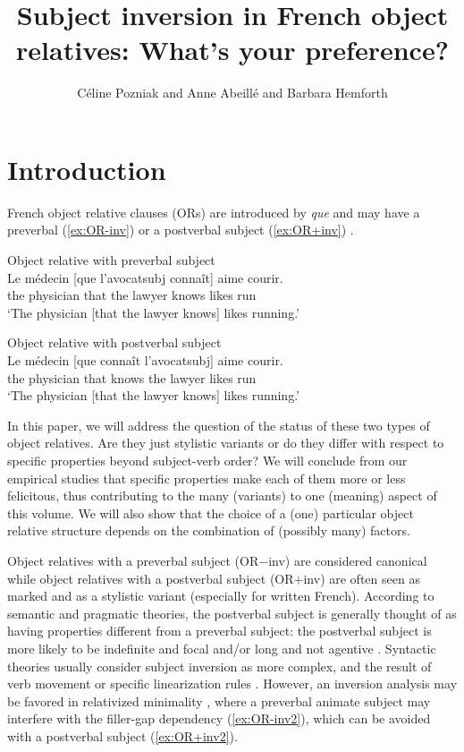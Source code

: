 \documentclass[output=paper]{langscibook}
\author{Céline Pozniak\affiliation{Université Paris 8, Structures Formelles du Langage, CNRS} and 
        Anne Abeillé\affiliation{Université de Paris, Laboratoire de linguistique formelle} and  
        Barbara Hemforth\affiliation{Université de Paris, Laboratoire de linguistique formelle, CNRS}}
\title{Subject inversion in French object relatives: What’s your preference?}
\begin{document}
\maketitle


\section{Introduction} 
French object relative clauses (ORs) are introduced by \textit{que} and may have a preverbal (\ref{ex:OR-inv}) or a postverbal subject (\ref{ex:OR+inv})  \citep{LeBidoisR1950, kayne1978}.


\begin{exe}
\ex Object relative with preverbal subject\label{ex:OR-inv}\\ 
\gll Le médecin [que l'avocat{\tiny subj} connaît] aime courir.\\   
the physician that {the lawyer} knows likes run\\
\glt `The physician [that the lawyer knows] likes running.'

\ex Object relative with postverbal subject\label{ex:OR+inv}\\  
\gll Le médecin [que connaît l'avocat{\tiny subj}] aime courir.\\    
the physician that knows {the lawyer}  likes run\\
\glt `The physician [that the lawyer knows] likes running.'
\end{exe}


In this paper, we will address the question of the status of these two
types of object relatives. Are they just stylistic variants or do they
differ with respect to specific properties beyond subject-verb order?
We will conclude from our empirical studies that specific properties
make each of them more or less felicitous, thus contributing to the
many (variants) to one (meaning) aspect of this volume. We will also
show that the choice of a (one) particular object relative structure
depends on the combination of (possibly many) factors.

\begin{sloppypar}
  Object relatives with a preverbal subject (OR$-$inv) are considered
  canonical while object relatives with a postverbal subject
  (OR$+$inv) are often seen as marked and as a stylistic variant
  (especially for written French).  According to semantic and
  pragmatic theories, the postverbal subject is generally thought of
  as having properties different from a preverbal subject: the
  postverbal subject is more likely to be indefinite and focal
  \citep{Lahousse2011} and/or long and not agentive \citep{Fuchs2006,
    marandin2011}.  Syntactic theories usually consider subject
  inversion as more complex, and the result of verb movement
  \citep{deprez1990two, HulkPollock2001} or specific linearization
  rules \citep{Bonami}. However, an inversion analysis may be favored in
  relativized minimality \citep{rizzi1990, Friedmann2009}, where a
  preverbal animate subject may interfere with the filler-gap
  dependency (\ref{ex:OR-inv2}), which can be avoided with a
  postverbal subject (\ref{ex:OR+inv2}).
\end{sloppypar}
\end{document}
